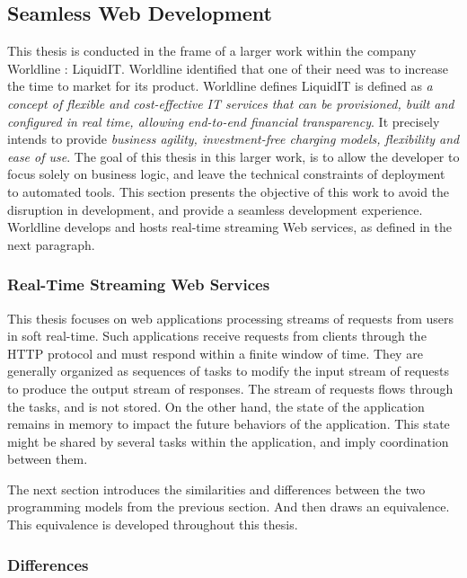 \subsection{Seamless Web Development}

This thesis is conducted in the frame of a larger work within the company Worldline : LiquidIT.
Worldline identified that one of their need was to increase the time to market for its product.
Worldline defines LiquidIT is defined as \textit{a concept of flexible and cost-effective IT services that can be provisioned, built and configured in real time, allowing end-to-end financial transparency}.
It precisely intends to provide \textit{business agility, investment-free charging models, flexibility and ease of use}.
The goal of this thesis in this larger work, is to allow the developer to focus solely on business logic, and leave the technical constraints of deployment to automated tools.
This section presents the objective of this work to avoid the disruption in development, and provide a seamless development experience.
Worldline develops and hosts real-time streaming Web services, as defined in the next paragraph.

\subsubsection{Real-Time Streaming Web Services}

This thesis focuses on web applications processing streams of requests from users in soft real-time.
Such applications receive requests from clients through the HTTP protocol and must respond within a finite window of time.
They are generally organized as sequences of tasks to modify the input stream of requests to produce the output stream of responses.
The stream of requests flows through the tasks, and is not stored.
On the other hand, the state of the application remains in memory to impact the future behaviors of the application.
This state might be shared by several tasks within the application, and imply coordination between them.

The next section introduces the similarities and differences between the two programming models from the previous section.
And then draws an equivalence.
This equivalence is developed throughout this thesis.

\subsubsection{Differences}

